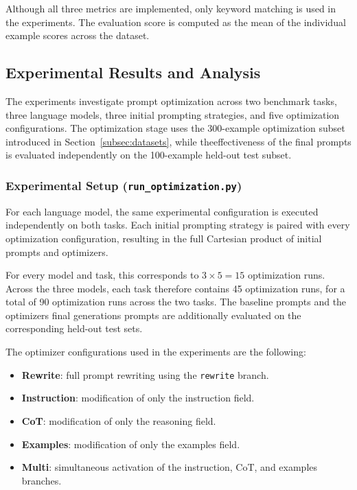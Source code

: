 \documentclass[pdflatex,sn-mathphys-num]{sn-jnl}%
\theoremstyle{thmstyleone}%
\theoremstyle{thmstyletwo}%
\theoremstyle{thmstylethree}%
\begin{document}
Although all three metrics are implemented, only keyword matching is
used in the experiments. The evaluation score is computed as the mean
of the individual example scores across the dataset.

\subsection{Experimental Results and Analysis}

The experiments investigate prompt optimization across two benchmark
tasks, three language models, three initial prompting strategies, and
five optimization configurations. The optimization stage uses the
300-example optimization subset introduced in Section~\ref{subsec:datasets}, 
while theeffectiveness of the final prompts is evaluated independently 
on the 100-example held-out test subset.

\subsubsection{Experimental Setup (\texttt{run\_optimization.py})}

For each language model, the same experimental configuration is
executed independently on both tasks. Each initial prompting strategy
is paired with every optimization configuration, resulting in the full
Cartesian product of initial prompts and optimizers.

For every model and task, this corresponds to
\(3\times5=15\) optimization runs. Across the three models, each task therefore
contains 45 optimization runs, for a total of 90 optimization runs
across the two tasks. The baseline prompts and the optimizers final generations prompts 
are additionally evaluated on the corresponding held-out test sets.

The optimizer configurations used in the experiments are the
following:

\begin{itemize}

\item \textbf{Rewrite}: full prompt rewriting using the
      \texttt{rewrite} branch.

\item \textbf{Instruction}: modification of only the instruction
      field.

\item \textbf{CoT}: modification of only the reasoning field.

\item \textbf{Examples}: modification of only the examples field.

\item \textbf{Multi}: simultaneous activation of the instruction,
      CoT, and examples branches.

\end{itemize}
\end{document}
